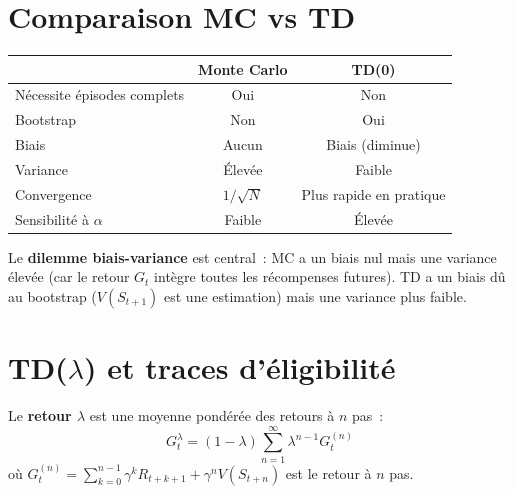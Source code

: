 \section{Comparaison MC vs TD}

\begin{center}
\renewcommand{\arraystretch}{1.3}
\begin{tabular}{lcc}
    \toprule
    & \textbf{Monte Carlo} & \textbf{TD(0)} \\
    \midrule
    N\'ecessite \'episodes complets & Oui & Non \\
    Bootstrap & Non & Oui \\
    Biais & Aucun & Biais (diminue) \\
    Variance & \'Elev\'ee & Faible \\
    Convergence & $1/\sqrt{N}$ & Plus rapide en pratique \\
    Sensibilit\'e \`a $\alpha$ & Faible & \'Elev\'ee \\
    \bottomrule
\end{tabular}
\end{center}

\begin{remarque}
Le \textbf{dilemme biais-variance} est central~: MC a un biais nul mais une
variance \'elev\'ee (car le retour $G_t$ int\`egre toutes les r\'ecompenses
futures). TD a un biais d\^u au bootstrap ($V(S_{t+1})$ est une estimation)
mais une variance plus faible.
\end{remarque}

\section{TD($\lambda$) et traces d'\'eligibilit\'e}

\begin{definition}
Le \textbf{retour $\lambda$} est une moyenne pond\'er\'ee des retours \`a $n$ pas~:
\[
    G_t^\lambda = (1-\lambda) \sum_{n=1}^{\infty} \lambda^{n-1} G_t^{(n)}
\]
o\`u $G_t^{(n)} = \sum_{k=0}^{n-1} \gamma^k R_{t+k+1} + \gamma^n V(S_{t+n})$
est le retour \`a $n$ pas.
\end{definition}

